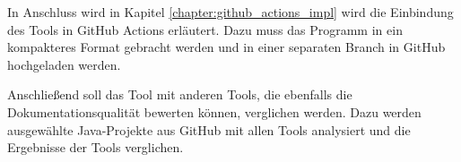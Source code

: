 In Anschluss wird in Kapitel \ref{chapter:github_actions_impl}  wird die Einbindung des Tools in GitHub Actions erläutert. Dazu muss das Programm in ein kompakteres Format gebracht werden und in einer separaten Branch in GitHub hochgeladen werden. 

Anschließend soll das Tool mit anderen Tools, die ebenfalls die Dokumentationsqualität bewerten können, verglichen werden. Dazu werden ausgewählte Java-Projekte aus GitHub mit allen Tools analysiert und die Ergebnisse der Tools verglichen. 







